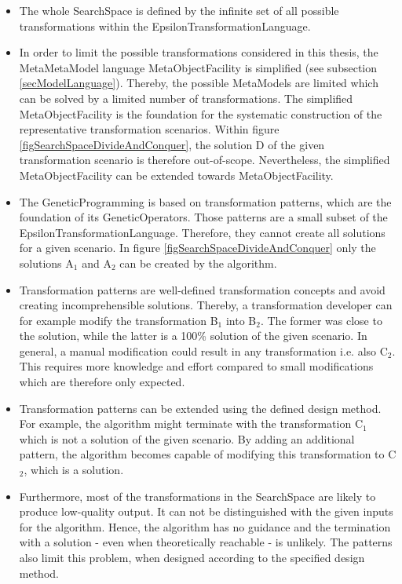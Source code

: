 \begin{itemize}
\item The whole \gls{SearchSpace} is defined by the infinite set of all possible transformations within the \gls{EpsilonTransformationLanguage}.
\item In order to limit the possible transformations considered in this thesis, the \gls{MetaMetaModel} language \gls{MetaObjectFacility} is simplified (see subsection \ref{secModelLanguage}). Thereby, the possible \glspl{MetaModel} are limited which can be solved by a limited number of transformations. The simplified \gls{MetaObjectFacility} is the foundation for the systematic construction of the representative transformation scenarios. Within figure \ref{figSearchSpaceDivideAndConquer}, the solution D of the given transformation scenario is therefore out-of-scope. Nevertheless, the simplified \gls{MetaObjectFacility} can be extended towards \gls{MetaObjectFacility}.
\item The \gls{GeneticProgramming} is based on transformation patterns, which are the foundation of its \glspl{GeneticOperator}. Those patterns are a small subset of the \gls{EpsilonTransformationLanguage}. Therefore, they cannot create all solutions for a given scenario. In figure \ref{figSearchSpaceDivideAndConquer} only the solutions A$_1$ and A$_2$ can be created by the algorithm. 
\item Transformation patterns are well-defined transformation concepts and avoid creating incomprehensible solutions. Thereby, a transformation developer can for example modify the transformation B$_1$ into B$_2$. The former was close to the solution, while the latter is a 100\% solution of the given scenario. In general, a manual modification could result in any transformation i.e. also C$_2$. This requires more knowledge and effort compared to small modifications which are therefore only expected.
\item Transformation patterns can be extended using the defined design method. For example, the algorithm might terminate with the transformation C$_1$ which is not a solution of the given scenario. By adding an additional pattern, the algorithm becomes capable of modifying this transformation to C$_2$, which is a solution. 
\item Furthermore, most of the transformations in the \gls{SearchSpace} are likely to produce low-quality output. It can not be distinguished with the given inputs for the algorithm. Hence, the algorithm has no guidance and the termination with a solution - even when theoretically reachable - is unlikely. The patterns also limit this problem, when designed according to the specified design method.
\end{itemize}

